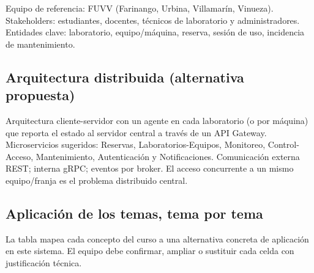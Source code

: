 \documentclass[11pt]{article}
\begin{document}
Equipo de referencia: FUVV (Farinango, Urbina, Villamarín, Vinueza). Stakeholders: estudiantes, docentes, técnicos de laboratorio y administradores. Entidades clave: laboratorio, equipo/máquina, reserva, sesión de uso, incidencia de mantenimiento.

\subsection{Arquitectura distribuida (alternativa propuesta)}
Arquitectura cliente-servidor con un agente en cada laboratorio (o por máquina) que reporta el estado al servidor central a través de un API Gateway. Microservicios sugeridos: Reservas, Laboratorios-Equipos, Monitoreo, Control-Acceso, Mantenimiento, Autenticación y Notificaciones. Comunicación externa REST; interna gRPC; eventos por broker. El acceso concurrente a un mismo equipo/franja es el problema distribuido central.

\subsection{Aplicación de los temas, tema por tema}
La tabla mapea cada concepto del curso a una alternativa concreta de aplicación en este sistema. El equipo debe confirmar, ampliar o sustituir cada celda con justificación técnica.
\end{document}
